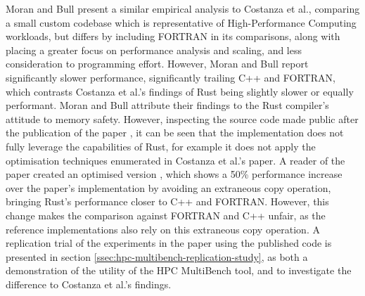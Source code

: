 Moran and Bull present a similar empirical analysis to Costanza et al., comparing a small custom codebase which is representative of High-Performance Computing workloads, but differs by including FORTRAN in its comparisons, along with placing a greater focus on performance analysis and scaling, and less consideration to programming effort. However, Moran and Bull report significantly slower performance, significantly trailing C++ and FORTRAN, which contrasts Costanza et al.'s findings of Rust being slightly slower or equally performant. Moran and Bull attribute their findings to the Rust compiler's attitude to memory safety. However, inspecting the source code made public after the publication of the paper \cite{Lmoran94Eurocc_cfdCFD}, it can be seen that the implementation does not fully leverage the capabilities of Rust, for example it does not apply the optimisation techniques enumerated in Costanza et al.'s paper. A reader of the paper created an optimised version  \cite{moranPaperFalse} \cite{phazer99HerePlayground2023}, which shows a 50\% performance increase over the paper's implementation by avoiding an extraneous copy operation, bringing Rust's performance closer to C++ and FORTRAN. However, this change makes the comparison against FORTRAN and C++ unfair, as the reference implementations also rely on this extraneous copy operation. A replication trial of the experiments in the paper using the published code is presented in section \ref{ssec:hpc-multibench-replication-study}, as both a demonstration of the utility of the HPC MultiBench tool, and to investigate the difference to Costanza et al.'s findings. %




